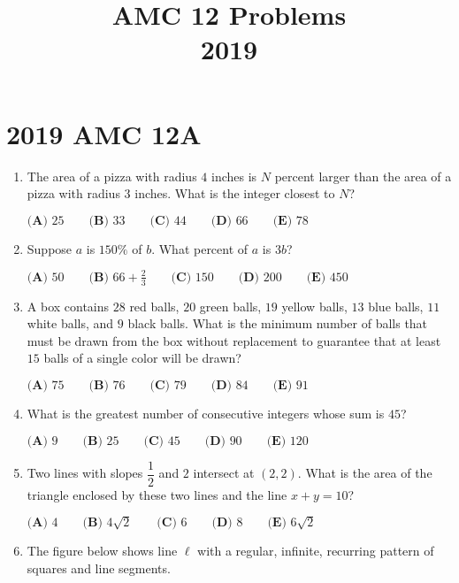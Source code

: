 \documentclass{article}
\title{AMC 12 Problems \\ 2019}
\date{}
\begin{document}
\maketitle\thispagestyle{fancy}\newpage\section*{2019 AMC 12A}\begin{enumerate}[label=\arabic*., itemsep=0.5em]\item The area of a pizza with radius \(4\) inches is \(N\) percent larger than the area of a pizza with radius \(3\) inches. What is the integer closest to \(N\)?

\(\textbf{(A) } 25 \qquad\textbf{(B) } 33 \qquad\textbf{(C) } 44\qquad\textbf{(D) } 66 \qquad\textbf{(E) } 78\)\par \vspace{0.5em}\item Suppose \(a\) is \(150\%\) of \(b\). What percent of \(a\) is \(3b\)?

\(\textbf{(A) } 50 \qquad \textbf{(B) } 66+\frac{2}{3} \qquad \textbf{(C) } 150 \qquad \textbf{(D) } 200 \qquad \textbf{(E) } 450\)\par \vspace{0.5em}\item A box contains \(28\) red balls, \(20\) green balls, \(19\) yellow balls, \(13\) blue balls, \(11\) white balls, and \(9\) black balls. What is the minimum number of balls that must be drawn from the box without replacement to guarantee that at least \(15\) balls of a single color will be drawn?

\(\textbf{(A) } 75 \qquad\textbf{(B) } 76 \qquad\textbf{(C) } 79 \qquad\textbf{(D) } 84 \qquad\textbf{(E) } 91\)\par \vspace{0.5em}\item What is the greatest number of consecutive integers whose sum is \(45\)?

\(\textbf{(A) } 9 \qquad\textbf{(B) } 25 \qquad\textbf{(C) } 45 \qquad\textbf{(D) } 90 \qquad\textbf{(E) } 120\)\par \vspace{0.5em}\item Two lines with slopes \(\dfrac{1}{2}\) and \(2\) intersect at \((2,2)\). What is the area of the triangle enclosed by these two lines and the line \(x+y=10\)?

\(\textbf{(A) } 4 \qquad\textbf{(B) } 4\sqrt{2} \qquad\textbf{(C) } 6 \qquad\textbf{(D) } 8 \qquad\textbf{(E) } 6\sqrt{2}\)\par \vspace{0.5em}\item The figure below shows line \(\ell\) with a regular, infinite, recurring pattern of squares and line segments.



\end{enumerate}
\end{document}
